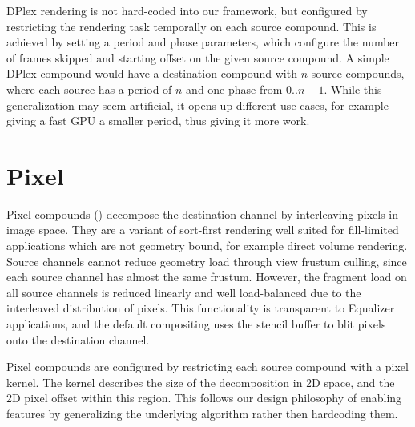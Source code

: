 DPlex rendering is not hard-coded into our framework, but configured by
restricting the rendering task temporally on each source compound. This is
achieved by setting a \textsf{period} and \textsf{phase} parameters, which
configure the number of frames skipped and starting offset on the given source
compound. A simple DPlex compound would have a destination compound with $n$
source compounds, where each source has a period of $n$ and one phase from
$0..n-1$. While this generalization may seem artificial, it opens up different
use cases, for example giving a fast GPU a smaller period, thus giving it more
work.

\section{Pixel}

Pixel compounds () decompose the destination channel by
interleaving pixels in image space. They are a variant of sort-first rendering
well suited for fill-limited applications which are not geometry bound, for
example direct volume rendering. Source channels cannot reduce geometry load
through view frustum culling, since each source channel has almost the same
frustum. However, the fragment load on all source channels is reduced linearly
and well load-balanced due to the interleaved distribution of pixels. This
functionality is transparent to \textsf{Equalizer} applications, and the
default compositing uses the stencil buffer to blit pixels onto the destination
channel.

Pixel compounds are configured by restricting each source compound with a pixel
kernel. The kernel describes the size of the decomposition in 2D space, and the
2D pixel offset within this region. This follows our design philosophy of
enabling features by generalizing the underlying algorithm rather then
hardcoding them.

